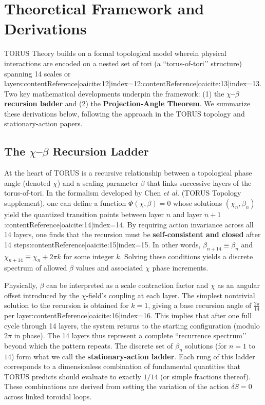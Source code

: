 \documentclass[12pt]{article}
\begin{document}
\section{Theoretical Framework and Derivations}\label{sec:derivation}
TORUS Theory builds on a formal topological model wherein physical interactions are encoded on a nested set of tori (a ``torus-of-tori’’ structure) spanning 14 scales or layers:contentReference[oaicite:12]{index=12}:contentReference[oaicite:13]{index=13}. Two key mathematical developments underpin the framework: (1) the \textbf{$\chi$–$\beta$ recursion ladder} and (2) the \textbf{Projection-Angle Theorem}. We summarize these derivations below, following the approach in the TORUS topology and stationary-action papers.

\subsection{The $\chi$–$\beta$ Recursion Ladder}
At the heart of TORUS is a recursive relationship between a topological phase angle (denoted $\chi$) and a scaling parameter $\beta$ that links successive layers of the torus-of-tori. In the formalism developed by Chen \emph{et al.} (TORUS Topology supplement), one can define a function $\Phi(\chi,\beta)=0$ whose solutions $(\chi_n,\beta_n)$ yield the quantized transition points between layer $n$ and layer $n+1$:contentReference[oaicite:14]{index=14}. By requiring action invariance across all 14 layers, one finds that the recursion must be \textbf{self-consistent and closed} after 14 steps:contentReference[oaicite:15]{index=15}. In other words, $\beta_{n+14} \equiv \beta_n$ and $\chi_{n+14} \equiv \chi_n + 2\pi k$ for some integer $k$. Solving these conditions yields a discrete spectrum of allowed $\beta$ values and associated $\chi$ phase increments.

Physically, $\beta$ can be interpreted as a scale contraction factor and $\chi$ as an angular offset introduced by the $\chi$-field’s coupling at each layer. The simplest nontrivial solution to the recursion is obtained for $k=1$, giving a base recursion angle of $\frac{2\pi}{14}$ per layer:contentReference[oaicite:16]{index=16}. This implies that after one full cycle through 14 layers, the system returns to the starting configuration (modulo $2\pi$ in phase). The 14 layers thus represent a complete ``recurrence spectrum’’ beyond which the pattern repeats. The discrete set of $\beta_n$ solutions (for $n=1$ to $14$) form what we call the \textbf{stationary-action ladder}. Each rung of this ladder corresponds to a dimensionless combination of fundamental quantities that TORUS predicts should evaluate to exactly $1/14$ (or simple fractions thereof). These combinations are derived from setting the variation of the action $\delta S=0$ across linked toroidal loops.
\end{document}
